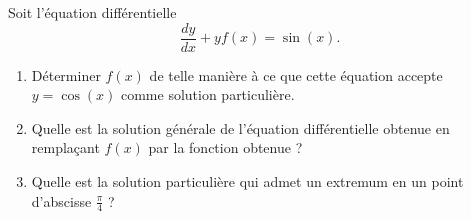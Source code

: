 \begin{exercice}\label{exoEquaDiff0004}

Soit l'équation différentielle
\begin{equation}
	\frac{ dy }{ dx }+yf(x)=\sin(x).
\end{equation}
\begin{enumerate}

\item
Déterminer $f(x)$ de telle manière à ce que cette équation accepte $y=\cos(x)$ comme solution particulière.
\item
Quelle est la solution générale de l'équation différentielle obtenue en remplaçant $f(x)$ par la fonction obtenue ?
\item
Quelle est la solution particulière qui admet un extremum en un point d'abscisse $\frac{ \pi }{ 4 }$ ?

\end{enumerate}

\end{exercice}
